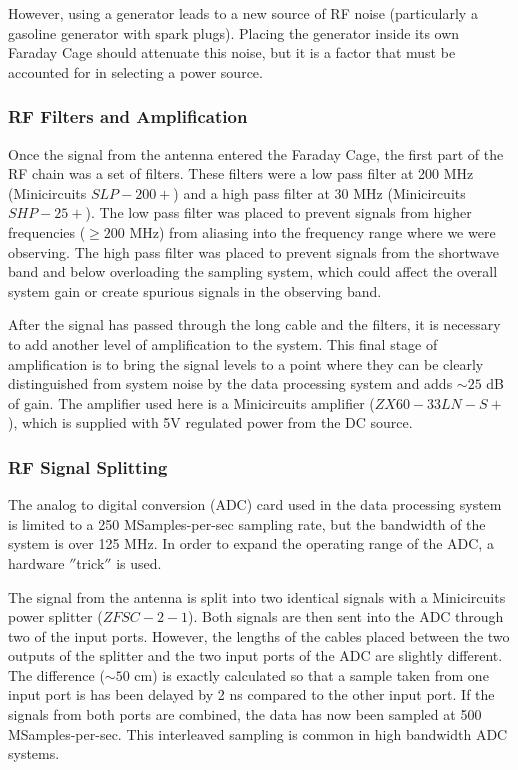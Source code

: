 However, using a generator leads to a new source of RF noise (particularly a gasoline generator with spark plugs). Placing the generator inside its own Faraday Cage should attenuate this noise, but it is a factor that must be accounted for in selecting a power source. 

\subsubsection{RF Filters and Amplification} \label{Sec:fcage_elec}

Once the signal from the antenna entered the Faraday Cage, the first part of the RF chain was a set of filters. These filters were a low pass filter at 200 MHz (Minicircuits $SLP-200+$) and a high pass filter at 30 MHz (Minicircuits $SHP-25+$). The low pass filter was placed to prevent signals from higher frequencies ($\geq 200$ MHz) from aliasing into the frequency range where we were observing. The high pass filter was placed to prevent signals from the shortwave band and below overloading the sampling system, which could affect the overall system gain or create spurious signals in the observing band. 

After the signal has passed through the long cable and the filters, it is necessary to add another level of amplification to the system. This final stage of amplification is to bring the signal levels to a point where they can be clearly distinguished from system noise by the data processing system and adds $\sim25$ dB of gain. The amplifier used here is a Minicircuits amplifier ($ZX60-33LN-S+$), which is supplied with 5V regulated power from the DC source. 

\subsubsection{RF Signal Splitting} \label{Sec:hard_split}

The analog to digital conversion (ADC) card used in the data processing system is limited to a 250 MSamples-per-sec sampling rate, but the bandwidth of the system is over 125 MHz. In order to expand the operating range of the ADC, a hardware $''$trick$''$ is used.

The signal from the antenna is split into two identical signals with a Minicircuits power splitter ($ZFSC-2-1$). Both signals are then sent into the ADC through two of the input ports. However, the lengths of the cables placed between the two outputs of the splitter and the two input ports of the ADC are slightly different. The difference ($\sim 50$ cm) is exactly calculated so that a sample taken from one input port is has been delayed by 2 ns compared to the other input port. If the signals from both ports are combined, the data has now been sampled at 500 MSamples-per-sec. This interleaved sampling is common in high bandwidth ADC systems. 

